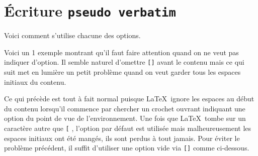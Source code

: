 \documentclass[12pt,a4paper]{article}
\begin{document}
\section{Écriture \texttt{pseudo verbatim}}




Voici comment s'utilise chacune des options.











Voici un 1\ier{} exemple montrant qu'il faut faire attention quand on ne veut pas indiquer d'option.
Il semble naturel d'omettre \verb#[]# avant le contenu mais ce qui suit met en lumière un petit problème quand on veut garder tous les espaces  initiaux du contenu.
 


Ce qui précède est tout à fait normal puisque \LaTeX\ ignore les espaces au début du contenu lorsqu'il commence par chercher un crochet ouvrant indiquant une option du point de vue de l'environnement.
Une fois que \LaTeX\ tombe sur un caractère autre que \verb#[# , l'option par défaut est utilisée mais malheureusement les espaces initiaux ont été mangés, ils sont perdus à tout jamais.
Pour éviter le problème précédent, il suffit d'utiliser une option vide via \verb#[]# comme ci-dessous.
 
\end{document}
